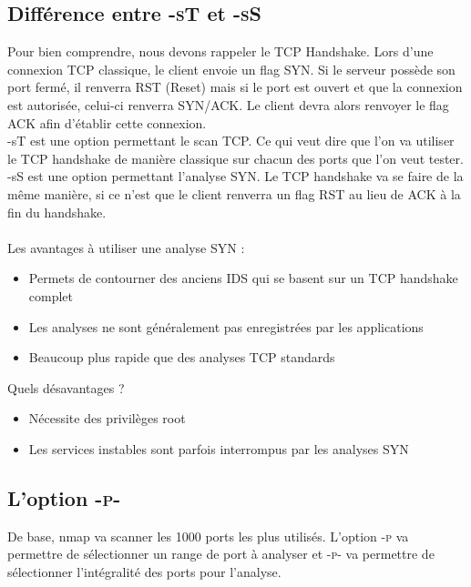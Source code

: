 \documentclass[a4paper]{article}
\begin{document}
\subsection{Différence entre \textsc{-sT} et \textsc{-sS}} \cite{2}
Pour bien comprendre, nous devons rappeler le TCP Handshake.
Lors d'une connexion TCP classique, le client envoie un flag \textsc{SYN}. Si le serveur possède son port fermé, il renverra \textsc{RST} (Reset) mais si le port est ouvert et que la connexion est autorisée, celui-ci renverra \textsc{SYN/ACK}. Le client devra alors renvoyer le flag \textsc{ACK} afin d'établir cette connexion.\\
-sT est une option permettant le scan TCP. Ce qui veut dire que l'on va utiliser le TCP handshake de manière classique sur chacun des ports que l'on veut tester.\\
-sS est une option permettant l'analyse \textsc{SYN}. Le TCP handshake va se faire de la même manière, si ce n'est que le client renverra un flag \textsc{RST} au lieu de \textsc{ACK} à la fin du handshake.\\\\
Les avantages à utiliser une analyse \textsc{SYN} : 
\begin{itemize}
    \item Permets de contourner des anciens IDS qui se basent sur un TCP handshake complet
    \item Les analyses ne sont généralement pas enregistrées par les applications
    \item Beaucoup plus rapide que des analyses TCP standards
\end{itemize}
Quels désavantages ?
\begin{itemize}
    \item Nécessite des privilèges root
    \item Les services instables sont parfois interrompus par les analyses SYN
\end{itemize}

\subsection{L'option \textsc{-p-}}
De base, nmap va scanner les 1000 ports les plus utilisés. L'option \textsc{-p} va permettre de sélectionner un range de port à analyser et \textsc{-p-} va permettre de sélectionner l'intégralité des ports pour l'analyse.
\end{document}
